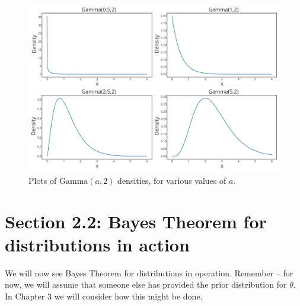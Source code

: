 \begin{figure}[!h]
\centering
\includegraphics{images/gammaplot1.svg}
\caption{Plots of $\mathrm{Gamma}(a,2)$ densities, for various values of $a$.}
\label{fig:gammaplot1}
\end{figure}

\clearpage

\section{Section 2.2: Bayes Theorem for distributions in action}
\noindent We will now see Bayes Theorem for distributions in operation.  Remember -- for now, we will assume that someone else has provided the prior distribution for $\theta$. In Chapter 3 we will consider how this might be done.  

